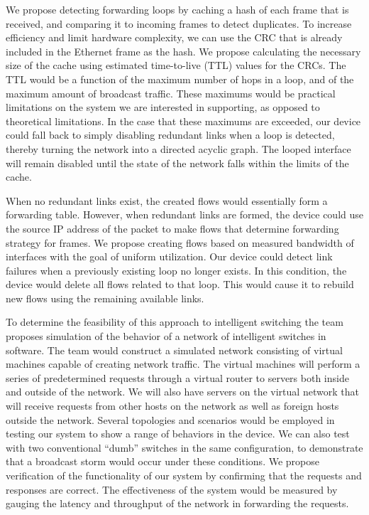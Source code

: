\documentclass{article}
\begin{document}
\begin{multicols}{2}
	We propose detecting forwarding loops by caching a hash of each frame that is received, and comparing it to incoming frames to detect duplicates.
	To increase efficiency and limit hardware complexity, we can use the CRC that is already included in the Ethernet frame as the hash.
	We propose calculating the necessary size of the cache using estimated time-to-live (TTL) values for the CRCs.
	The TTL would be a function of the maximum number of hops in a loop, and of the maximum amount of broadcast traffic.
	These maximums would be practical limitations on the system we are interested in supporting, as opposed to theoretical limitations.
	In the case that these maximums are exceeded, our device could fall back to simply disabling redundant links when a loop is detected, thereby turning the network into a directed acyclic graph.
	The looped interface will remain disabled until the state of the network falls within the limits of the cache.
	
	When no redundant links exist, the created flows would essentially form a forwarding table.
	However, when redundant links are formed, the device could use the source IP address of the packet to make flows that determine forwarding strategy for frames.
	We propose creating flows based on measured bandwidth of interfaces with the goal of uniform utilization.
	Our device could detect link failures when a previously existing loop no longer exists.
	In this condition, the device would delete all flows related to that loop.
	This would cause it to rebuild new flows using the remaining available links.

	To determine the feasibility of this approach to intelligent switching the team proposes simulation of the behavior of a network of intelligent switches in software.
	The team would construct a simulated network consisting of virtual machines capable of creating network traffic.
	The virtual machines will perform a series of predetermined requests through a virtual router to servers both inside and outside of the network.
	We will also have servers on the virtual network that will receive requests from other hosts on the network as well as foreign hosts outside the network.
	Several topologies and scenarios would be employed in testing our system to show a range of behaviors in the device.
	We can also test with two conventional ``dumb'' switches in the same configuration, to demonstrate that a broadcast storm would occur under these conditions.
	We propose verification of the functionality of our system by confirming that the requests and responses are correct.
	The effectiveness of the system would be measured by gauging the latency and throughput of the network in forwarding the requests.

\end{multicols}
\end{document}
